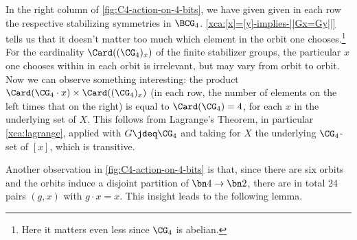 \begin{example}
In the right column of \cref{fig:C4-action-on-4-bits}, we have given
given in each row the respective stabilizing symmetries in $\BCG_4$.
\cref{xca:[x]=[y]-implies-||Gx=Gy||} tells us that it doesn't matter
too much which element in the orbit one chooses.\footnote{%
  Here it matters even less since $\CG_4$ is abelian.}
For the cardinality $\Card((\CG_4)_x)$ of the finite stabilizer groups, 
the particular $x$ one chooses within in each orbit is irrelevant,
but may vary from orbit to orbit. Now we can observe something
interesting: the product $\Card({\CG_4}\cdot {x}) \times \Card((\CG_4)_x)$
(\ie in each row, the number of elements on the left times that on the right)
is equal to $\Card(\CG_4) = 4$, for each $x$ in the underlying set of $X$.
This follows from Lagrange's Theorem, in particular \cref{xca:lagrange},
applied with $G\jdeq\CG_4$ and taking for $X$ the underlying $\CG_4$-set
of $[x]$, which is transitive.

Another observation in \cref{fig:C4-action-on-4-bits} is that, 
since there are six orbits and the orbits induce a disjoint partition
of $\bn4\to\bn2$, there are in total 24 pairs $(g,x)$ with $g\cdot x = x$.
This insight leads to the following lemma.
\end{example}


